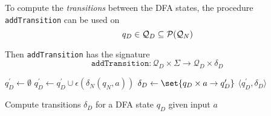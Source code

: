 \begin{definition}
    To compute the \textit{transitions} between the DFA states, the procedure \texttt{addTransition} can be used on
    \begin{equation}
        q_D \in \mathcal{Q}_D \subseteq \mathcal{P}(\mathcal{Q}_N)
    \end{equation}
    
    Then \texttt{addTransition} has the signature
    \begin{equation}
        \mathtt{addTransition} \colon \mathcal{Q}_D \times \Sigma \to \mathcal{Q}_D \times \delta_D
    \end{equation}
    
    \begin{algorithm}[H]
        \begin{algorithmic}[1]
                \State $q_D^\prime \gets \emptyset$
                    \State $q_D^\prime \gets q_D^\prime \cup \epsilon(\delta_N(q_N, a))$
                \EndFor
                \State $\delta_D \gets \set{q_D \times a \to q_D^\prime}$
                \State \Return $\langle q_D^\prime, \delta_D \rangle$
            \EndProcedure
        \end{algorithmic}
        \caption{Compute transitions $\delta_D$ for a DFA state $q_D$ given input $a$}
        \label{algo:nfa-dfa-add-transition}
    \end{algorithm}
\end{definition}

